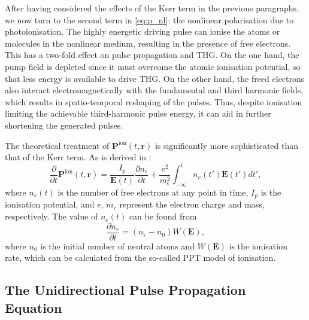 \documentclass[a4paper]{jpconf}
\begin{document}
After having considered the effects of the Kerr term in the previous paragraphs, we now turn to the second term in \eqref{eq:p_nl}: the nonlinear polarisation due to photoionisation. The highly energetic driving pulse can ionise the atoms or molecules in the nonlinear medium, resulting in the presence of free electrons. This has a two-fold effect on pulse propagation and THG. On the one hand, the pump field is depleted since it must overcome the atomic ionisation potential, so that less energy is available to drive THG. On the other hand, the freed electrons also interact electromagnetically with the fundamental and third harmonic fields, which results in spatio-temporal reshaping of the pulses. Thus, despite ionisation limiting the achievable third-harmonic pulse energy, it can aid in further shortening the generated pulses. \par 
The theoretical treatment of $\mathbf{P}^\text{ion}(t, \mathbf{r})$ is significantly more sophisticated than that of the Kerr term. As is derived in \cite{geissler1999}:
\begin{equation}\label{eq:p_ion}
\frac{\partial}{\partial t} \mathbf{P}^\text{ion}(t, \mathbf{r}) = \frac{I_p}{\mathbf{E}(t)} \frac{\partial n_e}{\partial t} + \frac{e^2}{m_e^2} \int_{-\infty}^t n_e(t') \mathbf{E}(t')dt',
\end{equation} 
where $n_e(t)$ is the number of free electrons at any point in time, $I_p$ is the ionisation potential, and $e$, $m_e$ represent the electron charge and mass, respectively. The value of $n_e(t)$ can be found from 
\begin{equation}
\frac{\partial n_e}{\partial t} = (n_e - n_0) W(\mathbf{E}),
\end{equation}
where $n_0$ is the initial number of neutral atoms and $W(\mathbf{E})$ is the ionisation rate, which can be calculated from the so-called PPT model of ionisation. 

\subsection{The Unidirectional Pulse Propagation Equation}
\end{document}
